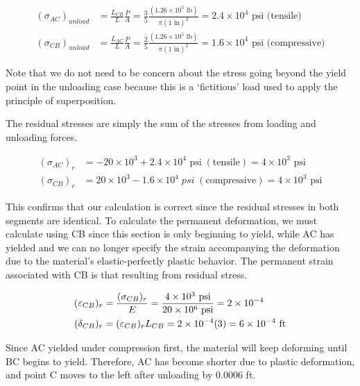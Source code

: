 \documentclass[
fontsize=10pt,
a4paper,
twosides=false,
open=any,
svgnames,
]{kaobook} %
\begin{document}
\begin{example}
  \begin{align*}
    (\sigma _{AC})_{unload} &= \frac{L_{CB}}{L}\frac{P}{A} = \frac{3}{5} \frac{(1.26 \times 10^5 \text{ lb})}{\pi {(1 \text{ in})^2}} = 2.4 \times {10^4} \text{ psi} \text{ (tensile)} \\
  (\sigma _{CB})_{unload} &= \frac{L_{AC}}{L}\frac{P}{A} = \frac{2}{5} \frac{(1.26 \times 10^5 \text{ lb})}{\pi (1 \text{ in})^2} = 1.6 \times {10^4} \text{ psi} \text{ (compressive)}
  \end{align*}	
  
  Note that we do not need to be concern about the stress going beyond the yield point in the unloading case because this is a ‘fictitious’ load used to apply the principle of superposition.
  
  The residual stresses are simply the sum of the stresses from loading and unloading forces.
  
  \begin{align*}
    ({\sigma _{AC}})_r &=  - 20 \times {10^3} + 2.4 \times {10^4} \text{ psi}\;({\text{tensile}}) = 4 \times 10^3 \text{ psi}  \\
    ({\sigma _{CB}})_r &= 20 \times {10^3} - 1.6 \times {10^4}\;psi\;({\text{compressive}}) = 4 \times 10^3 \text{ psi}
  \end{align*}	
  
  This confirms that our calculation is correct since the residual stresses in both segments are identical.
  To calculate the permanent deformation, we must calculate using CB since this section is only beginning to yield, while AC has yielded and we can no longer specify the strain accompanying the deformation due to the material’s elastic-perfectly plastic behavior. The permanent strain associated with CB is that resulting from residual stress.
  
  \begin{align*}
    (\varepsilon_{CB})_r &= \frac{(\sigma_{CB})_r}{E} = \frac{4 \times 10^3 \text{ psi}}{20 \times 10^6 \text{ psi}} = 2 \times 10^{-4} \hfill \\
    (\delta _{CB})_r &= (\varepsilon_{CB})_rL_{CB} = 2 \times 10^{-4}(3) = 6 \times 10^{-4} \text{ ft} \hfill 
  \end{align*}	
  
  Since AC yielded under compression first, the material will keep deforming until BC begins to yield. Therefore, AC has become shorter due to plastic deformation, and point C moves to the left after unloading by 0.0006 ft.
  
\end{example}
\end{document}
